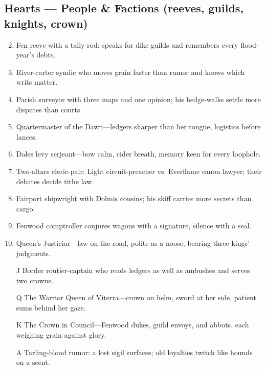 \subsection*{Hearts --- People \& Factions (reeves, guilds, knights, crown)}
\label{sec:viterra-people}
\begin{enumerate}
\setcounter{enumi}{1}
\item Fen reeve with a tally-rod; speaks for dike guilds and remembers every flood-year’s debts.
\item River-carter syndic who moves grain faster than rumor and knows which writs matter.
\item Parish surveyor with three maps and one opinion; his hedge-walks settle more disputes than courts.
\item Quartermaster of the Dawn—ledgers sharper than her tongue, logistics before lances.
\item Dales levy serjeant—bow calm, cider breath, memory keen for every loophole.
\item Two-altars cleric-pair: Light circuit-preacher vs. Everflame canon lawyer; their debates decide tithe law.
\item Fairport shipwright with Dolmis cousins; his skiff carries more secrets than cargo.
\item Fenwood comptroller conjures wagons with a signature, silence with a seal.
\item Queen’s Justiciar—law on the road, polite as a noose, bearing three kings’ judgments.
\item[J] Border routier-captain who reads ledgers as well as ambushes and serves two crowns.
\item[Q] The Warrior Queen of Viterra—crown on helm, sword at her side, patient sums behind her gaze.
\item[K] The Crown in Council—Fenwood dukes, guild envoys, and abbots, each weighing grain against glory.
\item[A] Tarling-blood rumor: a lost sigil surfaces; old loyalties twitch like hounds on a scent.
\end{enumerate}

